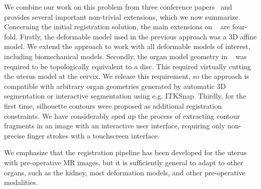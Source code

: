 We combine our work on this problem from three conference papers~\cite{Collins2044,Collins2013,Collins2017System} and provides several important non-trivial extensions, which we now summarize. Concerning the initial registration solution, the main extensions on ~\cite{Collins2044} are four-fold. Firstly, the deformable model used in the previous approach was a 3D affine model. We extend the approach to work with all deformable models of interest, including biomechanical models. Secondly, the organ model geometry in ~\cite{Collins2044} was required to be topologically equivalent to a disc. This required virtually cutting the uterus model at the cervix. We release this requirement, so the approach is compatible with arbitrary organ geometries generated by automatic 3D segmentation or interactive segmentation using e.g. ITKSnap.
Thirdly, for the first time, silhouette contours were proposed as additional registration constraints. We have considerably sped up the process of extracting contour fragments in an image with an interactive user interface, requiring only non-precise finger strokes with a touchscreen interface. %

We emphasize that the registration pipeline has been developed for the uterus with pre-operative MR images, but it is sufficiently general to adapt to other organs, such as the kidney, most deformation models, and other pre-operative modalities.



